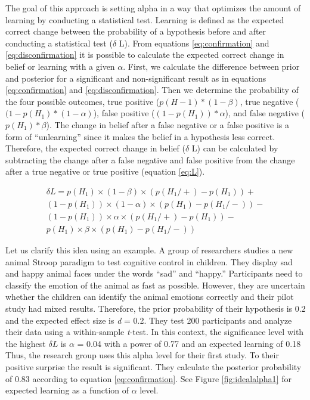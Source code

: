 \documentclass[
  english,
  ,jou,floatsintext]{apa6}
\begin{document}
The goal of this approach is setting alpha in a way that optimizes the amount of learning by conducting a statistical test. Learning is defined as the expected correct change between the probability of a hypothesis before and after conducting a statistical test (\(\delta\) L). From equations \ref{eq:confirmation} and \ref{eq:disconfirmation} it is possible to calculate the expected correct change in belief or learning with a given \(\alpha\). First, we calculate the difference between prior and posterior for a significant and non-significant result as in equations \ref{eq:confirmation} and \ref{eq:disconfirmation}. Then we determine the probability of the four possible outcomes, true positive (\(p(H-1)*(1-\beta)\), true negative (\((1-p(H_1)*(1-\alpha)\)), false positive (\((1-p(H_1))*\alpha\)), and false negative (\(p(H_1)*\beta\)). The change in belief after a false negative or a false positive is a form of ``unlearning'' since it makes the belief in a hypothesis less correct. Therefore, the expected correct change in belief (\(\delta\) L) can be calculated by subtracting the change after a false negative and false positive from the change after a true negative or true positive (equation \ref{eq:L}).

\begin{equation}
\label{eq:L}
\begin{aligned}
\delta L = p(H_1) \times (1-\beta) \times (p(H_1/+)-p(H_1))+ \\ (1-p(H_1)) \times (1-\alpha) \times (p(H_1)-p(H_1/-)) - \\ (1-p(H_1)) \times \alpha \times (p(H_1/+)- p(H_1))- \\ p(H_1) \times \beta \times (p(H_1)-p(H_1/-))
\end{aligned}
\end{equation}

Let us clarify this idea using an example. A group of researchers studies a new animal Stroop paradigm to test cognitive control in children. They display sad and happy animal faces under the words ``sad'' and ``happy.'' Participants need to classify the emotion of the animal as fast as possible. However, they are uncertain whether the children can identify the animal emotions correctly and their pilot study had mixed results. Therefore, the prior probability of their hypothesis is 0.2 and the expected effect size is \emph{d} = 0.2. They test 200 participants and analyze their data using a within-sample \emph{t}-test. In this context, the significance level with the highest \(\delta L\) is \(\alpha\) = 0.04 with a power of 0.77 and an expected learning of 0.18 Thus, the research group uses this alpha level for their first study. To their positive surprise the result is significant. They calculate the posterior probability of 0.83 according to equation \ref{eq:confirmation}. See Figure \ref{fig:idealalpha1} for expected learning as a function of \(\alpha\) level.
\end{document}
